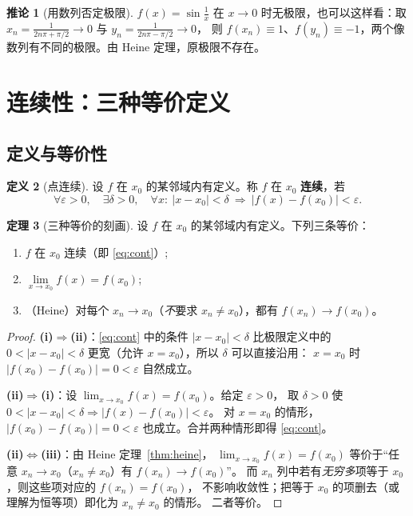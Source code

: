 \documentclass[11pt,a4paper]{ctexart}
\theoremstyle{definition}
\newtheorem{theorem}{定理}[section]
\newtheorem{corollary}[theorem]{推论}
\newtheorem{definition}[theorem]{定义}
\theoremstyle{remark}
\newcommand{\eps}{\varepsilon}
\newcommand{\abs}[1]{\left\lvert #1 \right\rvert}
\begin{document}
\begin{corollary}[用数列否定极限]
$f(x)=\sin\frac1x$ 在 $x\to0$ 时无极限，也可以这样看：取
$x_n=\frac{1}{2n\pi+\pi/2}\to0$ 与 $y_n=\frac{1}{2n\pi-\pi/2}\to0$，
则 $f(x_n)\equiv1$、$f(y_n)\equiv-1$，两个像数列有不同的极限。由 Heine 定理，原极限不存在。
\end{corollary}

\newpage

\section{连续性：三种等价定义}

\subsection{定义与等价性}

\begin{definition}[点连续]\label{def:cont}
设 $f$ 在 $x_0$ 的某邻域内有定义。称 $f$ 在 $x_0$ \textbf{连续}，若
\begin{equation}\label{eq:cont}
  \forall\eps>0,\quad \exists\delta>0,\quad \forall x:\ \abs{x-x_0}<\delta
  \ \Rightarrow\ \abs{f(x)-f(x_0)}<\eps .
\end{equation}
\end{definition}

\begin{theorem}[三种等价的刻画]\label{thm:cont-equiv}
设 $f$ 在 $x_0$ 的某邻域内有定义。下列三条等价：
\begin{enumerate}[label=(\roman*)]
  \item $f$ 在 $x_0$ 连续（即 \eqref{eq:cont}）;
  \item $\lim\limits_{x\to x_0}f(x)=f(x_0)$;
  \item（Heine）对每个 $x_n\to x_0$（\emph{不}要求 $x_n\neq x_0$），都有 $f(x_n)\to f(x_0)$。
\end{enumerate}
\end{theorem}

\begin{proof}
\textbf{(i)$\Rightarrow$(ii)}：\eqref{eq:cont} 中的条件 $\abs{x-x_0}<\delta$
比极限定义中的 $0<\abs{x-x_0}<\delta$ 更宽（允许 $x=x_0$），所以 $\delta$ 可以直接沿用：
$x=x_0$ 时 $\abs{f(x_0)-f(x_0)}=0<\eps$ 自然成立。

\textbf{(ii)$\Rightarrow$(i)}：设 $\lim_{x\to x_0}f(x)=f(x_0)$。给定 $\eps>0$，
取 $\delta>0$ 使 $0<\abs{x-x_0}<\delta\Rightarrow\abs{f(x)-f(x_0)}<\eps$。
对 $x=x_0$ 的情形，$\abs{f(x_0)-f(x_0)}=0<\eps$ 也成立。合并两种情形即得 \eqref{eq:cont}。

\textbf{(ii)$\Leftrightarrow$(iii)}：由 Heine 定理~\ref{thm:heine}，
$\lim_{x\to x_0}f(x)=f(x_0)$ 等价于“任意 $x_n\to x_0$（$x_n\neq x_0$）有 $f(x_n)\to f(x_0)$”。
而 $x_n$ 列中若有\emph{无穷多}项等于 $x_0$，则这些项对应的 $f(x_n)=f(x_0)$，
不影响收敛性；把等于 $x_0$ 的项删去（或理解为恒等项）即化为 $x_n\neq x_0$ 的情形。
二者等价。

\end{proof}
\end{document}
